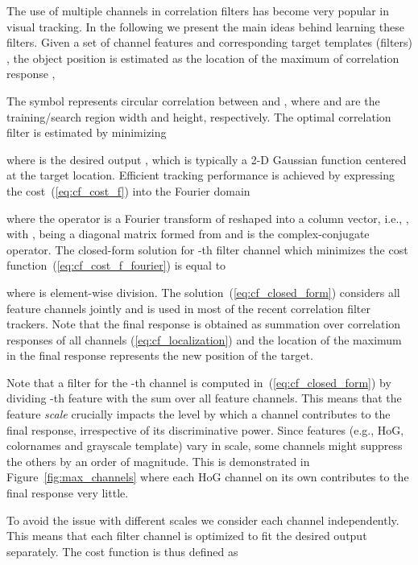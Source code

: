 \documentclass[twocolumn]{article}
\begin{document}
The use of multiple channels in correlation filters \citep{henriques2015tracking,danelljan_dsst_pami,galoogahi_multi_channel_correlation} has become very popular in visual tracking. In the following we present the main ideas behind learning these filters. Given a set of  channel features  and corresponding target templates (filters) , the object position is estimated as the location of the maximum of correlation response ,

The symbol  represents circular correlation between  and , where  and  are the training/search region width and height, respectively. The optimal correlation filter  is estimated by minimizing

where  is the desired output , which is typically a 2-D Gaussian function centered at the target location. Efficient tracking performance is achieved by expressing the cost~(\ref{eq:cf_cost_f}) into the Fourier domain

where the operator  is a Fourier  transform of  reshaped into a column vector, i.e., , with ,  being a  diagonal matrix formed from  and  is the complex-conjugate operator. The closed-form solution for -th filter channel  which minimizes the cost function~(\ref{eq:cf_cost_f_fourier}) is equal to

where  is element-wise division. The solution~(\ref{eq:cf_closed_form}) considers all feature channels jointly and is used in most of the recent correlation filter trackers. Note that the final response is obtained as summation over correlation responses of all channels (\ref{eq:cf_localization}) and  the location of the maximum in the final response represents the new position of the target.

Note that a filter for the -th channel is computed in~(\ref{eq:cf_closed_form})  by dividing -th feature with the sum over all feature channels. This means that the feature {\it scale} crucially impacts the level by which a channel contributes to the final response, irrespective of its discriminative power. Since features (e.g., HoG, colornames and grayscale template) vary in scale, some channels might suppress the others by an order of magnitude. This is demonstrated in Figure~\ref{fig:max_channels} where each HoG channel on its own contributes to the final response very little.



To avoid the issue with different scales we consider each channel independently. This means that each filter channel is optimized to fit the desired output separately. The cost function is thus defined as
\end{document}
